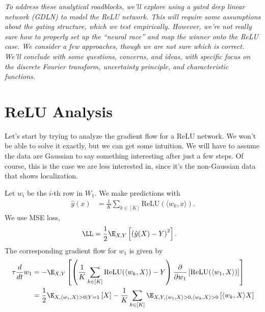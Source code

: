\documentclass{article}
\begin{document}
\emph{To address these analytical roadblocks, we'll explore using a gated deep linear network (GDLN) to model the ReLU network.
This will require some assumptions about the gating structure, which we test empirically.
However, we're not really sure how to properly set up the ``neural race'' and map the winner onto the ReLU case.
We consider a few approaches, though we are not sure which is correct.
We'll conclude with some questions, concerns, and ideas, with specific focus on the discrete Fourier transform, uncertainty principle, and characteristic functions.}


\section{ReLU Analysis}
Let's start by trying to analyze the gradient flow for a ReLU network.
We won't be able to solve it exactly, but we can get some intuition.
We will have to assume the data are Gaussian to say something interesting after just a few steps.
Of course, this is the case we are less interested in, since it's the non-Gaussian data that shows localization.

Let $w_i$ be the $i$-th row in $W_1$.
We make predictions with
\begin{align}
  \hat{y}(x) &= \frac{1}{K} \sum_{k \in [K]} \text{ReLU}(\langle w_k, x \rangle).
\end{align}
We use MSE loss,
\begin{align}
  \LL &= \frac{1}{2} \E_{X,Y} \left[ \left( \hat{y}(X) - Y \right)^2 \right].
\end{align}
The corresponding gradient flow for $w_1$ is given by
\begin{align}
  \tau \frac{d}{dt} w_1
  &= -\E_{X,Y} \left[ \left( \frac{1}{K} \sum_{k \in [K]} \text{ReLU}(\langle w_k, X \rangle) - Y \right) \frac{\partial}{\partial w_1} \left[ \text{ReLU}(\langle w_1, X \rangle) \right] \right] \\
  &= \frac{1}{2} \E_{X, \langle w_1, X \rangle > 0 \mid Y=1} \left[ X \right] - \frac{1}{K} \sum_{k \in [K]} \E_{X,Y, \langle w_1, X \rangle > 0, \langle w_k, X \rangle > 0} \left[ \langle w_k, X \rangle X \right]
\end{align}

\end{document}
